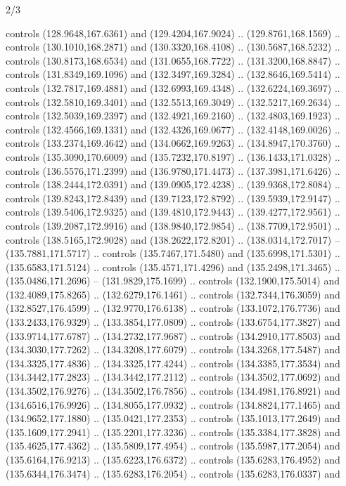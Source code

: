\begin{flagdescription}{2/3}
\begin{scope}[shift={(0.5\flaglength,0.5)},scale=\flagwidth/320]
\begin{scope}[y=0.8pt, x=0.8pt, yscale=-1,shift={(-118.3,-146)}]
  controls (128.9648,167.6361) and (129.4204,167.9024) .. (129.8761,168.1569) ..
  controls (130.1010,168.2871) and (130.3320,168.4108) .. (130.5687,168.5232) ..
  controls (130.8173,168.6534) and (131.0655,168.7722) .. (131.3200,168.8847) ..
  controls (131.8349,169.1096) and (132.3497,169.3284) .. (132.8646,169.5414) ..
  controls (132.7817,169.4881) and (132.6993,169.4348) .. (132.6224,169.3697) ..
  controls (132.5810,169.3401) and (132.5513,169.3049) .. (132.5217,169.2634) ..
  controls (132.5039,169.2397) and (132.4921,169.2160) .. (132.4803,169.1923) ..
  controls (132.4566,169.1331) and (132.4326,169.0677) .. (132.4148,169.0026) ..
  controls (133.2374,169.4642) and (134.0662,169.9263) .. (134.8947,170.3760) ..
  controls (135.3090,170.6009) and (135.7232,170.8197) .. (136.1433,171.0328) ..
  controls (136.5576,171.2399) and (136.9780,171.4473) .. (137.3981,171.6426) ..
  controls (138.2444,172.0391) and (139.0905,172.4238) .. (139.9368,172.8084) ..
  controls (139.8243,172.8439) and (139.7123,172.8792) .. (139.5939,172.9147) ..
  controls (139.5406,172.9325) and (139.4810,172.9443) .. (139.4277,172.9561) ..
  controls (139.2087,172.9916) and (138.9840,172.9854) .. (138.7709,172.9501) ..
  controls (138.5165,172.9028) and (138.2622,172.8201) .. (138.0314,172.7017) --
  (135.7881,171.5717) .. controls (135.7467,171.5480) and (135.6998,171.5301) ..
  (135.6583,171.5124) .. controls (135.4571,171.4296) and (135.2498,171.3465) ..
  (135.0486,171.2696) -- (131.9829,175.1699) .. controls (132.1900,175.5014) and
  (132.4089,175.8265) .. (132.6279,176.1461) .. controls (132.7344,176.3059) and
  (132.8527,176.4599) .. (132.9770,176.6138) .. controls (133.1072,176.7736) and
  (133.2433,176.9329) .. (133.3854,177.0809) .. controls (133.6754,177.3827) and
  (133.9714,177.6787) .. (134.2732,177.9687) .. controls (134.2910,177.8503) and
  (134.3030,177.7262) .. (134.3208,177.6079) .. controls (134.3268,177.5487) and
  (134.3325,177.4836) .. (134.3325,177.4244) .. controls (134.3385,177.3534) and
  (134.3442,177.2823) .. (134.3442,177.2112) .. controls (134.3502,177.0692) and
  (134.3502,176.9276) .. (134.3502,176.7856) .. controls (134.4981,176.8921) and
  (134.6516,176.9926) .. (134.8055,177.0932) .. controls (134.8824,177.1465) and
  (134.9652,177.1880) .. (135.0421,177.2353) .. controls (135.1013,177.2649) and
  (135.1609,177.2941) .. (135.2201,177.3236) .. controls (135.3384,177.3828) and
  (135.4625,177.4362) .. (135.5809,177.4954) .. controls (135.5987,177.2054) and
  (135.6164,176.9213) .. (135.6223,176.6372) .. controls (135.6283,176.4952) and
  (135.6344,176.3474) .. (135.6283,176.2054) .. controls (135.6283,176.0337) and

\end{scope}
\end{scope}
\end{flagdescription}
